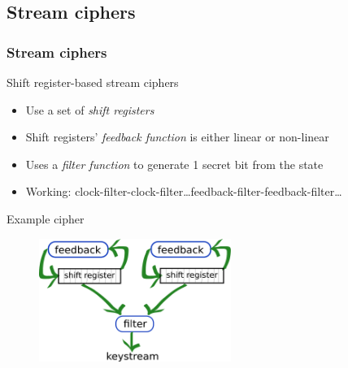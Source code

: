 \documentclass[xcolor=usenames,xcolor=svgnames,table,slidestop,compress,mathserif]{beamer}
\begin{document}
% 

\subsection{Stream ciphers}

\frame
{
\frametitle{Stream ciphers}
\begin{beamerboxesrounded}[shadow=true]{Shift register-based stream ciphers}
\begin{itemize}
 \item Use a set of \emph{shift registers}
 \item Shift registers' \emph{feedback function} is either linear or non-linear
 \item Uses a \emph{filter function} to generate 1 secret bit from the state
 \item Working: clock-filter-clock-filter\ldots feedback-filter-feedback-filter\ldots
\end{itemize}
\end{beamerboxesrounded}

\begin{beamerboxesrounded}[shadow=true]{Example cipher}
\begin{figure}
\centering
\includegraphics[height=4cm]{stream_cipher/stream_cipher}
\end{figure}
\end{beamerboxesrounded}
}
\end{document}
